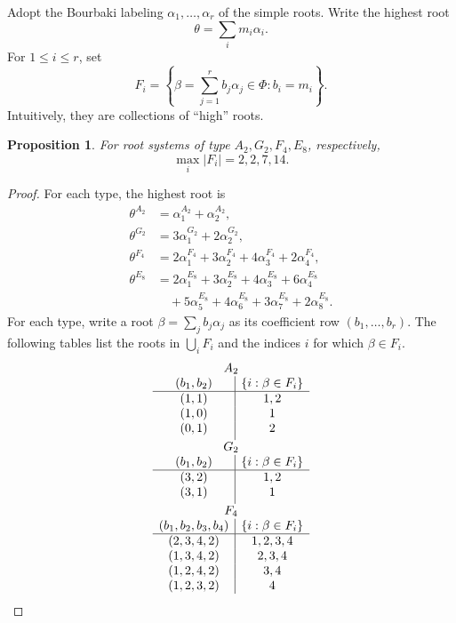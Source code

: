 \documentclass[10pt,a4paper]{amsart}
\newtheorem{proposition}[theorem]{Proposition}
\begin{document}
Adopt the Bourbaki labeling $\alpha_1,\ldots,\alpha_r$ of the simple roots. Write the highest root $$\theta=\sum_i m_i\alpha_i.$$ For $1\le i\le r$, set
\[
    F_i=\left\{\beta=\sum_{j=1}^r b_j\alpha_j\in\Phi:b_i=m_i\right\}.
\]
Intuitively, they are collections of ``high'' roots.
\begin{proposition}\label{rootcounts}
    For root systems of type $A_2,G_2,F_4,E_8$, respectively, $$\max_i|F_i|=2,2,7,14.$$
\end{proposition}
\begin{proof}
    For each type, the highest root is
    \[
    \begin{aligned}
        \theta^{A_2}
            &=\alpha_1^{A_2}+\alpha_2^{A_2},\\
        \theta^{G_2}
            &=3\alpha_1^{G_2}+2\alpha_2^{G_2},\\
        \theta^{F_4}
            &=2\alpha_1^{F_4}+3\alpha_2^{F_4}
              +4\alpha_3^{F_4}+2\alpha_4^{F_4},\\
        \theta^{E_8}
            &=2\alpha_1^{E_8}+3\alpha_2^{E_8}
              +4\alpha_3^{E_8}+6\alpha_4^{E_8}\\
            &\quad+5\alpha_5^{E_8}+4\alpha_6^{E_8}
              +3\alpha_7^{E_8}+2\alpha_8^{E_8}.
    \end{aligned}
    \]
    For each type, write a root $\beta=\sum_j b_j\alpha_j$ as its coefficient row $(b_1,\ldots,b_r)$. The following tables list the roots in $\bigcup_iF_i$ and the indices $i$ for which $\beta\in F_i$.
    {\small
    \[
    \begin{array}{c|c}
    \multicolumn{2}{c}{A_2}\\
    (b_1,b_2)&\{i:\beta\in F_i\}\\ \hline
    (1,1)&1,2\\
    (1,0)&1\\
    (0,1)&2\\[3pt]
    \multicolumn{2}{c}{G_2}\\
    (b_1,b_2)&\{i:\beta\in F_i\}\\ \hline
    (3,2)&1,2\\
    (3,1)&1\\[3pt]
    \multicolumn{2}{c}{F_4}\\
    (b_1,b_2,b_3,b_4)&\{i:\beta\in F_i\}\\ \hline
    (2,3,4,2)&1,2,3,4\\
    (1,3,4,2)&2,3,4\\
    (1,2,4,2)&3,4\\
    (1,2,3,2)&4\\

\end{array}\]}
\end{proof}
\end{document}
